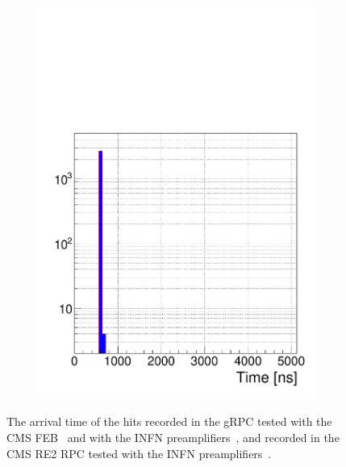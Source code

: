 \begin{figure}[H]
\begin{subfigure}{.5\linewidth}
			\caption{\label{fig:time-profiles:B}}
		\end{subfigure}
		\begin{subfigure}{\linewidth}
		    \centering
			\includegraphics[width = .4\linewidth]{fig/chapt6/Muon-Time-Profile-RE2-INFN.pdf}
			\caption{\label{fig:time-profiles:C}}
		\end{subfigure}
		\caption{\label{fig:time-profiles} The arrival time of the hits recorded in the gRPC tested with the CMS FEB~ and with the INFN preamplifiers~, and recorded in the CMS RE2 RPC tested with the INFN preamplifiers~.}
	\end{figure}
    
